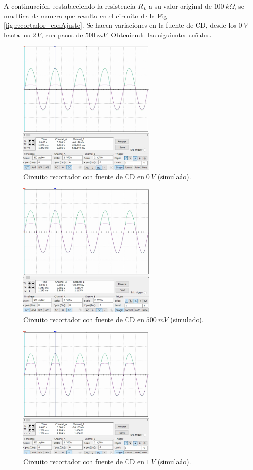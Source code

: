 \documentclass[journal]{IEEEtran}
\begin{document}
A continuación, restableciendo la resistencia $R_L$ a su valor original de $100~k\Omega$, se modifica de manera que resulta en el circuito de la Fig. \ref{fig:recortador_conAjuste}.
Se hacen variaciones en la fuente de CD, desde los $0~V$ hasta los $2~V$, con pasos de $500~mV$. Obteniendo las siguientes señales.
\begin{figure}[H]
        \centering
        \includegraphics[width=2.7in]{SignalSimulated_05.png}
        \caption{Circuito recortador con fuente de CD en $0~V$ (simulado).}
        \label{fig:SignalSimulated_05}
\end{figure}
\begin{figure}[H]
        \centering
        \includegraphics[width=2.7in]{SignalSimulated_06.png}
        \caption{Circuito recortador con fuente de CD en $500~mV$ (simulado).}
        \label{fig:SignalSimulated_06}
\end{figure}
\begin{figure}[H]
        \centering
        \includegraphics[width=2.7in]{SignalSimulated_07.png}
        \caption{Circuito recortador con fuente de CD en $1~V$ (simulado).}
        \label{fig:SignalSimulated_07}
\end{figure}
\end{document}

